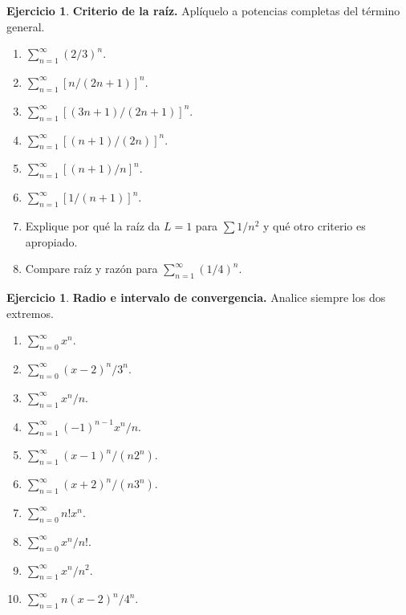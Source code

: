 \documentclass[12pt]{article}
\theoremstyle{definition}
\newtheorem{Ejer}[teorema]{Ejercicio}
\theoremstyle{remark}
\begin{document}
\begin{Ejer}\textbf{Criterio de la raíz.} Aplíquelo a potencias completas del término general.
\begin{enumerate}[resume=banco4]
\item $\displaystyle\sum_{n=1}^\infty (2/3)^n$.
\item $\displaystyle\sum_{n=1}^\infty [n/(2n+1)]^n$.
\item $\displaystyle\sum_{n=1}^\infty [(3n+1)/(2n+1)]^n$.
\item $\displaystyle\sum_{n=1}^\infty [(n+1)/(2n)]^n$.
\item $\displaystyle\sum_{n=1}^\infty [(n+1)/n]^n$.
\item $\displaystyle\sum_{n=1}^\infty [1/(n+1)]^n$.
\item Explique por qué la raíz da $L=1$ para $\sum1/n^2$ y qué otro criterio es apropiado.
\item Compare raíz y razón para $\sum_{n=1}^\infty(1/4)^n$.
\end{enumerate}
\end{Ejer}

\begin{Ejer}\textbf{Radio e intervalo de convergencia.} Analice siempre los dos extremos.
\begin{enumerate}[resume=banco4]
\item $\displaystyle\sum_{n=0}^\infty x^n$.
\item $\displaystyle\sum_{n=0}^\infty (x-2)^n/3^n$.
\item $\displaystyle\sum_{n=1}^\infty x^n/n$.
\item $\displaystyle\sum_{n=1}^\infty (-1)^{n-1}x^n/n$.
\item $\displaystyle\sum_{n=1}^\infty (x-1)^n/(n2^n)$.
\item $\displaystyle\sum_{n=1}^\infty (x+2)^n/(n3^n)$.
\item $\displaystyle\sum_{n=0}^\infty n!x^n$.
\item $\displaystyle\sum_{n=0}^\infty x^n/n!$.
\item $\displaystyle\sum_{n=1}^\infty x^n/n^2$.
\item $\displaystyle\sum_{n=1}^\infty n(x-2)^n/4^n$.
\end{enumerate}
\end{Ejer}
\end{document}
